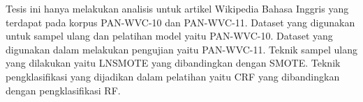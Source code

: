 Tesis ini hanya melakukan analisis untuk artikel Wikipedia Bahasa Inggris yang
terdapat pada korpus PAN-WVC-10 dan PAN-WVC-11.
Dataset yang digunakan untuk sampel ulang dan pelatihan model yaitu PAN-WVC-10.
Dataset yang digunakan dalam melakukan pengujian yaitu PAN-WVC-11.
Teknik sampel ulang yang dilakukan yaitu LNSMOTE yang dibandingkan dengan
SMOTE.
Teknik pengklasifikasi yang dijadikan dalam pelatihan yaitu CRF yang
dibandingkan dengan pengklasifikasi RF.
